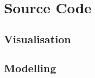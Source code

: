 \documentclass[source_code.tex]{subfiles}
\begin{document}
\section{Source Code} %
\label{sec:source_code}
\subsection{Visualisation} %
\label{sub:visualisation}
 

\subsection{Modelling} %
\label{sub:modelling}
 
\end{document}
